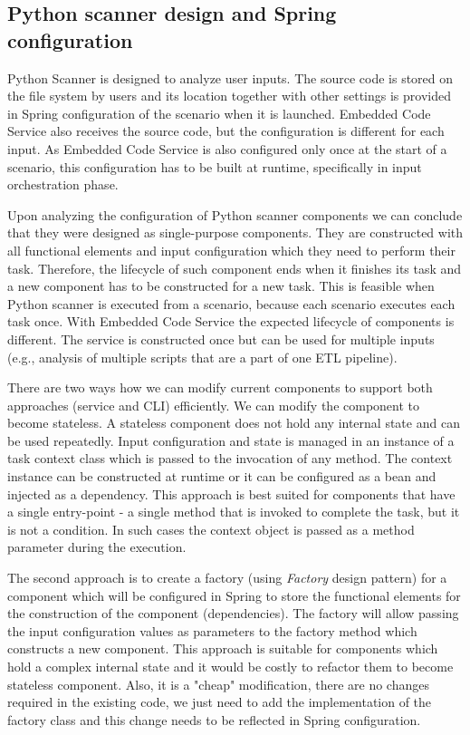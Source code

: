 \subsection{Python scanner design and Spring configuration}
Python Scanner is designed to analyze user inputs. The source code is stored on the file system by users and its location together with other settings is provided in Spring configuration of the scenario when it is launched. Embedded Code Service also receives the source code, but the configuration is different for each input. As Embedded Code Service is also configured only once at the start of a scenario, this configuration has to be built at runtime, specifically in input orchestration phase. 
\par
Upon analyzing the configuration of Python scanner components we can conclude that they were designed as single-purpose components. They are constructed with all functional elements and input configuration which they need to perform their task. Therefore, the lifecycle of such component ends when it finishes its task and a new component has to be constructed for a new task. This is feasible when Python scanner is executed from a scenario, because each scenario executes each task once. With Embedded Code Service the expected lifecycle of components is different. The service is constructed once but can be used for multiple inputs (e.g., analysis of multiple scripts that are a part of one ETL pipeline).
\par
There are two ways how we can modify current components to support both approaches (service and CLI) efficiently. We can modify the component to become stateless. A stateless component does not hold any internal state and can be used repeatedly. Input configuration and state is managed in an instance of a task context class which is passed to the invocation of any method. The context instance can be constructed at runtime or it can be configured as a bean and injected as a dependency. This approach is best suited for components that have a single entry-point - a single method that is invoked to complete the task, but it is not a condition. In such cases the context object is passed as a method parameter during the execution.
\par
The second approach is to create a factory (using \textit{Factory} design pattern) for a component which will be configured in Spring to store the functional elements for the construction of the component (dependencies). The factory will allow passing the input configuration values as parameters to the factory method which constructs a new component. This approach is suitable for components which hold a complex internal state and it would be costly to refactor them to become stateless component. Also, it is a "cheap" modification, there are no changes required in the existing code, we just need to add the implementation of the factory class and this change needs to be reflected in Spring configuration.

